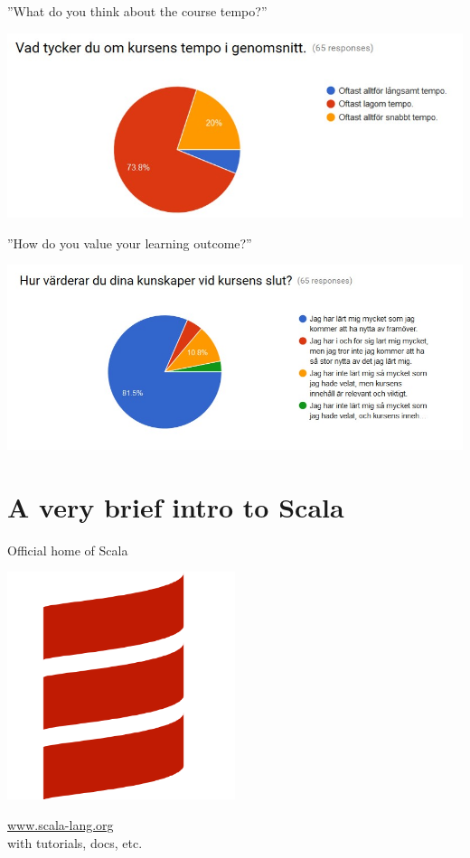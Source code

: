 \documentclass{lecturenotes}
\newcommand{\Section}[1]{\section{#1}\frame{\centering\huge\bfseries\textcolor{blue}{#1}}}
\begin{document}
\begin{Slide}{''What do you think about the course tempo?''}
\begin{center}
\includegraphics[width=\textwidth]{img/Q-tempo}
\end{center}
\end{Slide}


\begin{Slide}{''How do you value your learning outcome?''}
\begin{center}
\includegraphics[width=\textwidth]{img/Q-learned}
\end{center}
\end{Slide}

\Section{A very brief intro to Scala}

\begin{Slide}{Official home of Scala}
\begin{multicols}{2}
\includegraphics[width=0.5\textwidth]{../../img/scala-logo}

\columnbreak

\hfill\vfill{\large\url{www.scala-lang.org}}\\ with tutorials, docs, etc.

\end{multicols}
\end{Slide}
\end{document}

